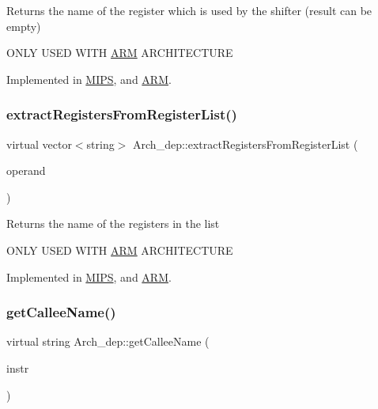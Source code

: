 Returns the name of the register which is used by the shifter (result can be empty)

O\+N\+LY U\+S\+ED W\+I\+TH \hyperlink{classARM}{A\+RM} A\+R\+C\+H\+I\+T\+E\+C\+T\+U\+RE 

Implemented in \hyperlink{classMIPS_ae48954f0e93827c1cb8225cac3857464}{M\+I\+PS}, and \hyperlink{classARM_a12e96058317496e995642601bd65fb12}{A\+RM}.

\mbox{\label{classArch__dep_afac73b40e179fbab3fc0954aa060548f}} 
\subsubsection{\texorpdfstring{extract\+Registers\+From\+Register\+List()}{extractRegistersFromRegisterList()}}
{\footnotesize\ttfamily virtual vector$<$string$>$ Arch\+\_\+dep\+::extract\+Registers\+From\+Register\+List (\begin{DoxyParamCaption}\item[{const string \&}]{operand }\end{DoxyParamCaption})\hspace{0.3cm}{\ttfamily [pure virtual]}}

Returns the name of the registers in the list

O\+N\+LY U\+S\+ED W\+I\+TH \hyperlink{classARM}{A\+RM} A\+R\+C\+H\+I\+T\+E\+C\+T\+U\+RE 

Implemented in \hyperlink{classMIPS_a6eecdd7a94436748b1bc224cf78ac075}{M\+I\+PS}, and \hyperlink{classARM_abbd225e086b20313a6eb5afbb45b955a}{A\+RM}.

\mbox{\label{classArch__dep_ad09e79609dda858cdbd651064623ae2b}} 
\subsubsection{\texorpdfstring{get\+Callee\+Name()}{getCalleeName()}}
{\footnotesize\ttfamily virtual string Arch\+\_\+dep\+::get\+Callee\+Name (\begin{DoxyParamCaption}\item[{const \hyperlink{classObjdumpInstruction}{Objdump\+Instruction} \&}]{instr }\end{DoxyParamCaption})\hspace{0.3cm}{\ttfamily [pure virtual]}}


